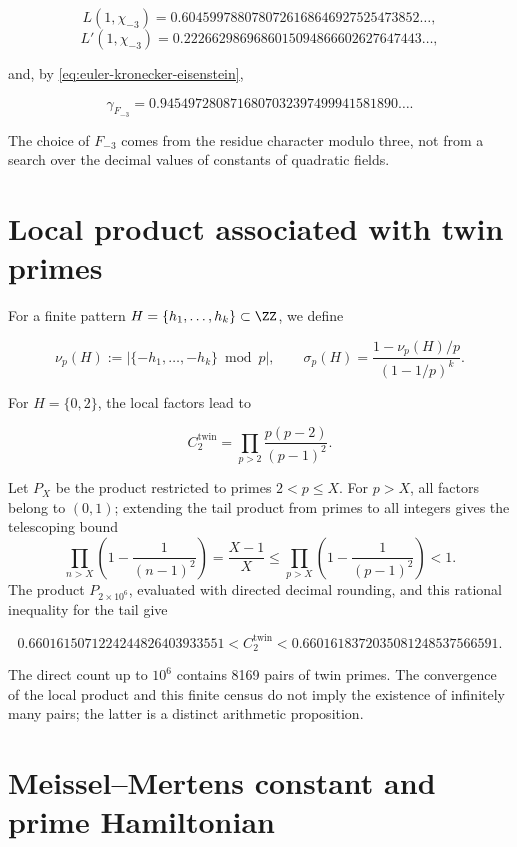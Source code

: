 \[
 L(1,\chi_{-3})
 =0.6045997880780726168646927525473852\ldots,
\]
\[
 L'(1,\chi_{-3})
 =0.2226629869686015094866602627647443\ldots,
\]

and, by \eqref{eq:euler-kronecker-eisenstein},

\[
 \gamma_{F_{-3}}
 =0.9454972808716807032397499941581890\ldots.
\]

The choice of $F_{-3}$ comes from the residue character modulo three, not from
a search over the decimal values of constants of quadratic
fields.

\section{Local product associated with twin primes}

For a finite pattern $H=\{h_1,\ldots,h_k\}\subset\ZZ$, we define

\[
 \nu_p(H):=\left|\{-h_1,\ldots,-h_k\}\bmod p\right|,
 \qquad
 \sigma_p(H)=
 \frac{1-\nu_p(H)/p}{(1-1/p)^k}.
\]

For $H=\{0,2\}$, the local factors lead to

\begin{equation}
 C_2^{\mathrm{twin}}
 =\prod_{p>2}\frac{p(p-2)}{(p-1)^2}.
 \label{eq:constante-primos-gemelos}
\end{equation}

Let \(P_X\) be the product restricted to primes \(2<p\leq X\). For
\(p>X\), all factors belong to \((0,1)\); extending the tail
product from primes to all integers gives the telescoping
bound
\[
 \prod_{n>X}\left(1-\frac1{(n-1)^2}\right)
 =\frac{X-1}{X}
 \leq
 \prod_{p>X}\left(1-\frac1{(p-1)^2}\right)<1.
\]
The product \(P_{2\times10^6}\), evaluated with directed decimal rounding, and
this rational inequality for the tail give

\begin{equation}
 0.6601615071224244826403933551
 <C_2^{\mathrm{twin}}<
 0.6601618372035081248537566591.
 \label{eq:intervalo-primos-gemelos}
\end{equation}

The direct count up to $10^6$ contains 8169 pairs of twin primes. The
convergence of the local product and this finite census do not imply the
existence of infinitely many pairs; the latter is a distinct arithmetic
proposition.

\section{Meissel--Mertens constant and prime Hamiltonian}

